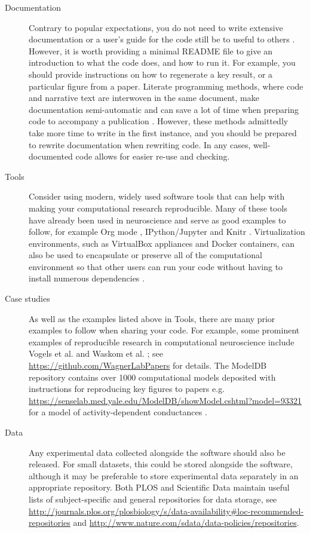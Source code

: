 \documentclass[11pt]{article}
\begin{document}
\begin{description}
\item [Documentation] Contrary to popular expectations, you do not
  need to write extensive documentation or a user's guide for the code
  still be to useful to others \cite{Barnes2010-iv}.  However, it is
  worth providing a minimal README file to give an introduction to
  what the code does, and how to run it.  For example, you should
  provide instructions on how to regenerate a key result, or a
  particular figure from a paper. Literate programming methods, where
  code and narrative text are interwoven in the same document, make
  documentation semi-automatic and can save a lot of time when
  preparing code to accompany a publication \cite{schulte2012multi,
    gentleman2012statistical}. However, these methods admittedly take
  more time to write in the first instance, and you should be prepared
  to rewrite documentation when rewriting code.  In any cases,
  well-documented code allows for easier re-use and checking.

\item [Tools] Consider using modern, widely used software tools that
  can help with making your computational research reproducible.  Many
  of these tools have already been used in neuroscience and serve as
  good examples to follow, for example Org mode \cite{Delescluse2011},
  IPython/Jupyter \cite{Stevens2013} and Knitr \cite{Eglen2014}.
  Virtualization environments, such as VirtualBox appliances and
  Docker containers, can also be used to encapsulate or preserve all
  of the computational environment so that other users can run your
  code without having to install numerous dependencies
  \cite{Boettiger2015}.


\item [Case studies] As well as the examples listed above in
  Tools\cite{Delescluse2011,Stevens2013,Eglen2014}, there are many
  prior examples to follow when sharing your code.  For example, some
  prominent examples of reproducible research in computational
  neuroscience include Vogels et al. \cite{Vogels2011-c8c} and Waskom
  et al. \cite{Waskom2014-gd}; see
  \url{https://github.com/WagnerLabPapers} for details.  The ModelDB
  repository contains over 1000 computational models deposited with
  instructions for reproducing key figures to papers
  e.g. \url{https://senselab.med.yale.edu/ModelDB/showModel.cshtml?model=93321}
  for a model of activity-dependent conductances \cite{Liu1998}.



\item [Data] Any experimental data collected alongside the software
  should also be released.  For small datasets, this could be stored
  alongside the software, although it may be preferable to store
  experimental data separately in an appropriate repository.  Both
  PLOS and Scientific Data maintain useful lists of subject-specific and
  general repositories for data storage, see
  \url{http://journals.plos.org/plosbiology/s/data-availability#loc-recommended-repositories} and
  \url{http://www.nature.com/sdata/data-policies/repositories}.
  


\end{description}
\end{document}
